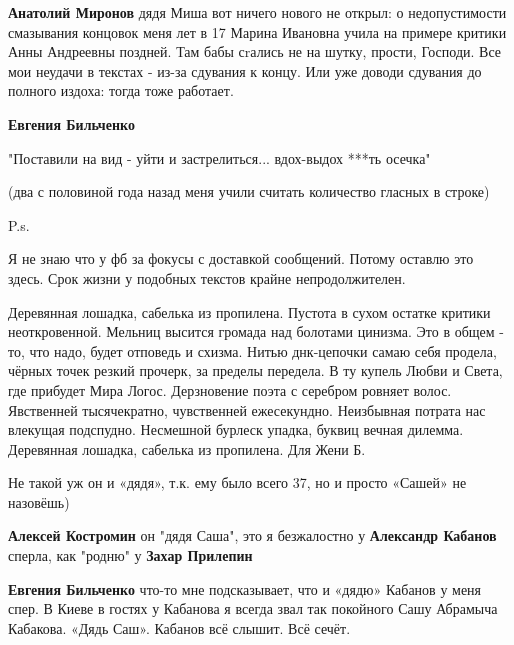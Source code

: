 \begin{itemize}
\begin{itemize}
\textbf{Анатолий Миронов} дядя Миша вот ничего нового не открыл: о недопустимости смазывания концовок меня лет в 17 Марина Ивановна учила на примере критики Анны Андреевны поздней. Там бабы сrались не на шутку, прости, Господи. Все мои неудачи в текстах - из-за сдувания к концу. Или уже доводи сдувания до полного издоха: тогда тоже работает.

\textbf{Евгения Бильченко} 

"Поставили на вид - уйти и застрелиться... вдох-выдох ***ть осечка"

(два с половиной года назад меня учили считать количество гласных в строке)

P.s.

Я не знаю что у фб за фокусы с доставкой сообщений. Потому оставлю это здесь.
Срок жизни у подобных текстов крайне непродолжителен.


\begin{multicols}{2}
\obeycr
Деревянная лошадка,
сабелька из пропилена.
Пустота в сухом остатке
критики неоткровенной.
\smallskip
Мельниц высится громада
над болотами цинизма.
Это в общем - то, что надо,
будет отповедь и схизма.
\smallskip
Нитью днк-цепочки
самаю себя продела,
чёрных точек резкий прочерк,
за пределы передела.
\smallskip
В ту купель Любви и Света,
где прибудет Мира Логос.
Дерзновение поэта
с серебром ровняет волос.
\smallskip
Явственней тысячекратно,
чувственней ежесекундно.
Неизбывная потрата
нас влекущая подспудно.
\smallskip
Несмешной бурлеск упадка,
буквиц вечная дилемма.
Деревянная лошадка,
сабелька из пропилена.
\smallskip
Для Жени Б.
\restorecr
\end{multicols}

\end{itemize} %


Не такой уж он и «дядя», т.к. ему было всего 37, но и просто «Сашей» не
назовёшь)

\begin{itemize} %
\textbf{Алексей Костромин} он "дядя Саша", это я безжалостно у \textbf{Александр Кабанов} сперла, как "родню" у \textbf{Захар Прилепин}

\textbf{Евгения Бильченко} что-то мне подсказывает, что и «дядю» Кабанов у меня спер. В Киеве в гостях у Кабанова я всегда звал так покойного Сашу Абрамыча Кабакова. «Дядь Саш». Кабанов всё слышит. Всё сечёт.


\end{itemize}
\end{itemize}
